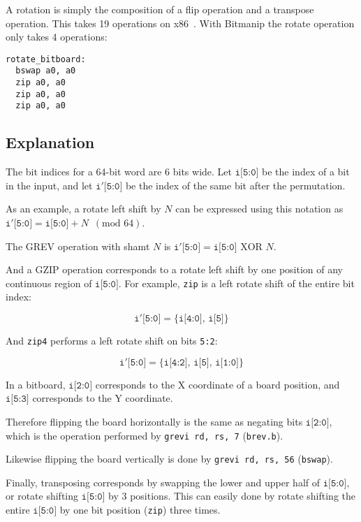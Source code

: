 A rotation is simply the composition of a flip operation and a transpose
operation. This takes 19 operations on x86~\cite{ChessProg}. With Bitmanip
the rotate operation only takes 4 operations:

\begin{verbatim}
rotate_bitboard:
  bswap a0, a0
  zip a0, a0
  zip a0, a0
  zip a0, a0
\end{verbatim}

\subsection{Explanation}

The bit indices for a 64-bit word are 6 bits wide. Let $\texttt{i[5:0]}$ be the
index of a bit in the input, and let $\texttt{i$'$[5:0]}$ be the index of the
same bit after the permutation.

As an example, a rotate left shift by $N$ can be expressed using this notation
as $\texttt{i$'$[5:0]} = \texttt{i[5:0]} + N \,\,\, (\textrm{mod 64})$.

The GREV operation with shamt $N$ is $\texttt{i$'$[5:0]} = \texttt{i[5:0]} \textrm{ XOR } N$.

And a GZIP operation corresponds to a rotate left shift by one position of any
continuous region of $\texttt{i[5:0]}$. For example, {\tt zip} is a left rotate shift
of the entire bit index:

$$\texttt{i$'$[5:0]} = \{ \texttt{i[4:0]},\, \texttt{i[5]} \}$$

And {\tt zip4} performs a left rotate shift on bits {\tt 5:2}:

$$\texttt{i$'$[5:0]} = \{ \texttt{i[4:2]},\, \texttt{i[5]},\, \texttt{i[1:0]} \}$$

In a bitboard, $\texttt{i[2:0]}$ corresponds to the X coordinate of a board position, and
$\texttt{i[5:3]}$ corresponds to the Y coordinate.

Therefore flipping the board horizontally is the same as negating bits $\texttt{i[2:0]}$,
which is the operation performed by {\tt grevi rd, rs, 7} ({\tt brev.b}).

Likewise flipping the board vertically is done by {\tt grevi rd, rs, 56} ({\tt bswap}).

Finally, transposing corresponds by swapping the lower and upper half of $\texttt{i[5:0]}$,
or rotate shifting $\texttt{i[5:0]}$ by 3 positions. This can easily done by rotate shifting the entire
$\texttt{i[5:0]}$ by one bit position ({\tt zip}) three times.

